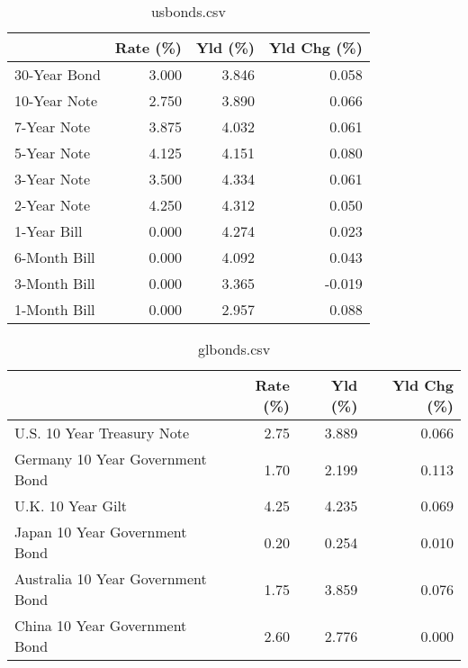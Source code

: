 \documentclass{article}%
\begin{document}
%


\begin{table}[htbp]%
\caption{usbonds.csv}%
\centering%
\begin{adjustbox}{width=1\textwidth}%
\begin{tabular}{lrrr}
\toprule
             &  Rate (\%) &  Yld (\%) &  Yld Chg (\%) \\
\midrule
30-Year Bond &     3.000 &    3.846 &        0.058 \\
10-Year Note &     2.750 &    3.890 &        0.066 \\
 7-Year Note &     3.875 &    4.032 &        0.061 \\
 5-Year Note &     4.125 &    4.151 &        0.080 \\
 3-Year Note &     3.500 &    4.334 &        0.061 \\
 2-Year Note &     4.250 &    4.312 &        0.050 \\
 1-Year Bill &     0.000 &    4.274 &        0.023 \\
6-Month Bill &     0.000 &    4.092 &        0.043 \\
3-Month Bill &     0.000 &    3.365 &       -0.019 \\
1-Month Bill &     0.000 &    2.957 &        0.088 \\
\bottomrule
\end{tabular}
%
\end{adjustbox}%
\end{table}

%


\begin{table}[htbp]%
\caption{glbonds.csv}%
\centering%
\begin{adjustbox}{width=1\textwidth}%
\begin{tabular}{lrrr}
\toprule
                                  &  Rate (\%) &  Yld (\%) &  Yld Chg (\%) \\
\midrule
       U.S. 10 Year Treasury Note &      2.75 &    3.889 &        0.066 \\
  Germany 10 Year Government Bond &      1.70 &    2.199 &        0.113 \\
                U.K. 10 Year Gilt &      4.25 &    4.235 &        0.069 \\
    Japan 10 Year Government Bond &      0.20 &    0.254 &        0.010 \\
Australia 10 Year Government Bond &      1.75 &    3.859 &        0.076 \\
    China 10 Year Government Bond &      2.60 &    2.776 &        0.000 \\
\bottomrule
\end{tabular}
%
\end{adjustbox}%
\end{table}
\end{document}
